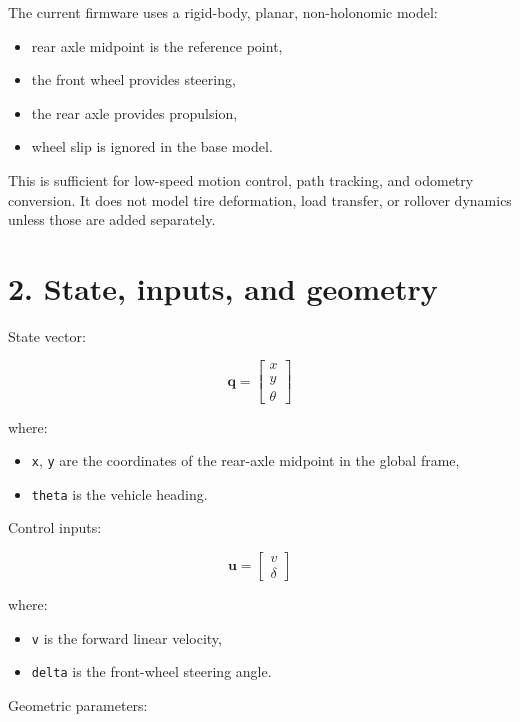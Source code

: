 \documentclass[12pt,a4paper,oneside]{report}
\providecommand{\tightlist}{\setlength{\itemsep}{0pt}\setlength{\parskip}{0pt}}
\begin{document}
The current firmware uses a rigid-body, planar, non-holonomic model:

\begin{itemize}
\tightlist
\item
  rear axle midpoint is the reference point,
\item
  the front wheel provides steering,
\item
  the rear axle provides propulsion,
\item
  wheel slip is ignored in the base model.
\end{itemize}

This is sufficient for low-speed motion control, path tracking, and odometry
conversion. It does not model tire deformation, load transfer, or rollover
dynamics unless those are added separately.

\section{2. State, inputs, and geometry}\label{state-inputs-and-geometry}

State vector:

\[
\mathbf{q} = \begin{bmatrix} x \\ y \\ \theta \end{bmatrix}
\]

where:

\begin{itemize}
\tightlist
\item
  \texttt{x}, \texttt{y} are the coordinates of the rear-axle midpoint in the
  global frame,
\item
  \texttt{theta} is the vehicle heading.
\end{itemize}

Control inputs:

\[
\mathbf{u} = \begin{bmatrix} v \\ \delta \end{bmatrix}
\]

where:

\begin{itemize}
\tightlist
\item
  \texttt{v} is the forward linear velocity,
\item
  \texttt{delta} is the front-wheel steering angle.
\end{itemize}

Geometric parameters:
\end{document}

